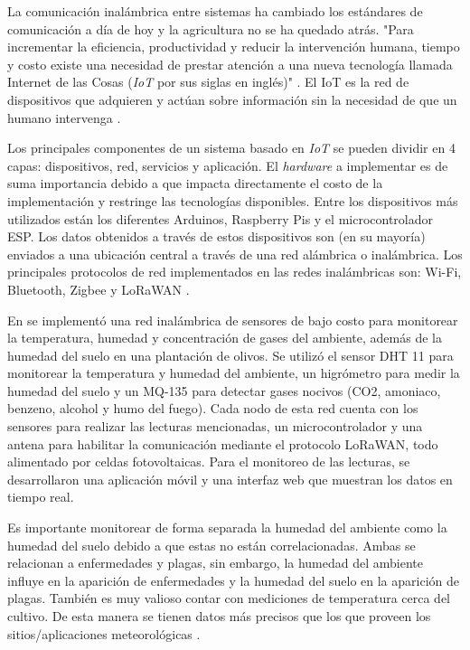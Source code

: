 \documentclass[final,12pt]{article}
\begin{document}
La comunicación inalámbrica entre sistemas ha cambiado los estándares de comunicación a día de hoy y la agricultura no se ha quedado atrás. 
"Para incrementar la eficiencia, productividad y reducir la intervención humana, tiempo y costo existe una necesidad de prestar atención a una
nueva tecnología llamada Internet de las Cosas (\textit{IoT} por sus siglas en inglés)" \cite{agriculture_automation_review}. El IoT es la red de dispositivos 
que adquieren y actúan sobre información sin la necesidad de que un humano intervenga \cite{agriculture_automation_review}. 

Los principales componentes de un sistema basado en \textit{IoT} se pueden dividir en 4 capas: dispositivos, red, servicios y aplicación. 
El \textit{hardware} a implementar es de suma importancia debido a que impacta directamente el costo de la implementación y restringe 
las tecnologías disponibles. Entre los dispositivos más utilizados están los diferentes Arduinos, Raspberry Pis y el microcontrolador ESP. 
Los datos obtenidos a través de estos dispositivos son (en su mayoría) enviados a una ubicación central a través de una red alámbrica o inalámbrica.
Los principales protocolos de red implementados en las redes inalámbricas son: Wi-Fi, Bluetooth, Zigbee y LoRaWAN \cite{systematicreviewiot}. 

En \cite{olive_orchard_monitorization} se implementó una red inalámbrica de sensores de bajo costo para monitorear la temperatura, humedad y concentración de gases 
del ambiente, además de la humedad del suelo en una plantación de olivos. Se utilizó el sensor DHT 11 para monitorear la temperatura y humedad del ambiente, un
higrómetro para medir la humedad del suelo y un MQ-135 para detectar gases nocivos (CO2, amoniaco, benzeno, alcohol y humo del fuego). Cada nodo de esta 
red cuenta con los sensores para realizar las lecturas mencionadas, un microcontrolador y una antena para habilitar la comunicación mediante el protocolo 
LoRaWAN, todo alimentado por celdas fotovoltaicas. Para el monitoreo de las lecturas, se desarrollaron una aplicación móvil y una interfaz web que 
muestran los datos en tiempo real.

Es importante monitorear de forma separada la humedad del ambiente como la humedad del suelo debido a que estas no están correlacionadas. Ambas se relacionan
a enfermedades y plagas, sin embargo, la humedad del ambiente influye en la aparición de enfermedades y la humedad del suelo en la aparición de plagas. También
es muy valioso contar con mediciones de temperatura cerca del cultivo. De esta manera se tienen datos más precisos que los que proveen los sitios/aplicaciones 
meteorológicas \cite{olive_orchard_monitorization}.
\end{document}
